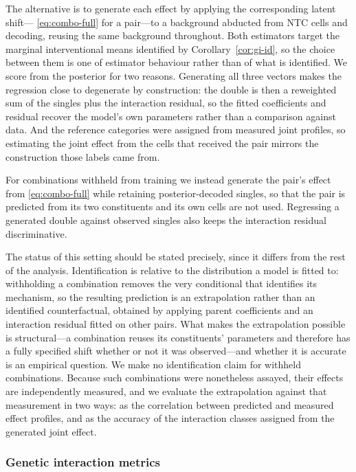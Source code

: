 The alternative is to generate each effect by applying the corresponding latent shift---
\eqref{eq:combo-full} for a pair---to a background abducted from NTC cells and decoding, reusing the
same background throughout. Both estimators target the marginal interventional means identified by
Corollary~\ref{cor:gi-id}, so the choice between them is one of estimator behaviour rather than of
what is identified. We score from the posterior for two reasons. Generating all three vectors makes
the regression close to degenerate by construction: the double is then a reweighted sum of the
singles plus the interaction residual, so the fitted coefficients and residual recover the model's own
parameters rather than a comparison against data. And the reference categories were assigned from
measured joint profiles, so estimating the joint effect from the cells that received the pair mirrors
the construction those labels came from.

For combinations withheld from training we instead generate the pair's effect from
\eqref{eq:combo-full} while retaining posterior-decoded singles, so that the pair is predicted from
its two constituents and its own cells are not used. Regressing a generated double against observed
singles also keeps the interaction residual discriminative.

The status of this setting should be stated precisely, since it differs from the rest of the
analysis. Identification is relative to the distribution a model is fitted to: withholding a
combination removes the very conditional that identifies its mechanism, so the resulting prediction
is an extrapolation rather than an identified counterfactual, obtained by applying parent
coefficients and an interaction residual fitted on other pairs. What makes the extrapolation possible
is structural---a combination reuses its constituents' parameters and therefore has a fully specified
shift whether or not it was observed---and whether it is accurate is an empirical question. We make
no identification claim for withheld combinations. Because such combinations were nonetheless
assayed, their effects are independently measured, and we evaluate the extrapolation against that
measurement in two ways: as the correlation between predicted and measured effect profiles, and as
the accuracy of the interaction classes assigned from the generated joint effect.

\subsubsection{Genetic interaction metrics}
\label{sec:gi-scoring}

